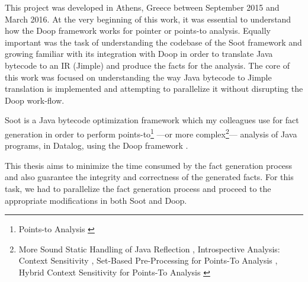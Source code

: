 \documentclass{dithesis}
\begin{document}
\tableofcontents
\listoffigures
\listoftables



\begin{thesisprologue}[Preface]
    This project was developed in Athens, Greece between September 2015 and March 2016. At the very beginning of this work, it was essential to understand how the Doop framework works for pointer or points-to analysis. Equally important was the task of understanding the codebase of the Soot framework and growing familiar with its integration with Doop in order to translate Java bytecode to an IR (Jimple) and produce the facts for the analysis. The core of this work was focused on understanding the way Java bytecode to Jimple translation is implemented and attempting to parallelize it without disrupting the Doop work-flow.
\end{thesisprologue}

\newcommand{\tab}[1]{\hspace{.2\textwidth}\rlap{#1}}

	Soot \cite{Sable: Soot} is a Java bytecode optimization framework which my colleagues use for fact generation in order to perform points-to\footnote{Points-to Analysis \cite{Points-to Analysis}} ---or more complex\footnote{More Sound Static Handling of Java Reflection \cite{More Sound Static Handling of Java Reflection}, Introspective Analysis: Context Sensitivity \cite{Introspective Analysis: Context Sensitivity}, Set-Based Pre-Processing for Points-To Analysis \cite{Set-Based Pre-Processing for Points-To Analysis}, Hybrid Context Sensitivity for Points-To Analysis \cite{Hybrid Context Sensitivity for Points-To Analysis}}--- analysis of Java programs, in Datalog, using the Doop framework \cite{Doop: Framework for Java Pointer Analysis}. 

	This thesis aims to minimize the time consumed by the fact generation process and also guarantee the integrity and correctness of the generated facts. For this task, we had to parallelize the fact generation process and proceed to the appropriate modifications in both Soot and Doop.
\end{document}
